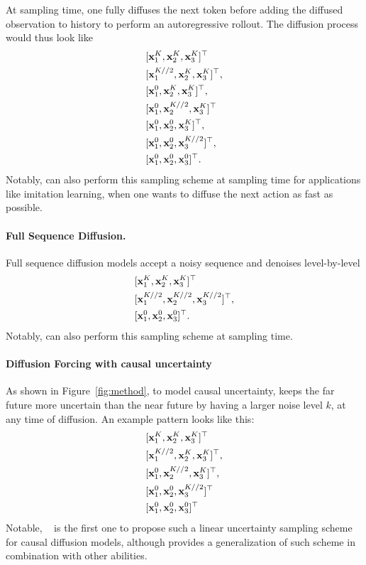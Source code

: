 At sampling time, one fully diffuses the next token before adding the diffused observation to history to perform an autoregressive rollout. The diffusion process would thus look like 
\begin{align*}
&[\mathbf{x}_1^K,\mathbf{x}_2^K,\mathbf{x}_3^K]^\top\\
&[\mathbf{x}_1^{K//2},\mathbf{x}_2^K,\mathbf{x}_3^K]^\top,\\
&[\mathbf{x}_1^{0},\mathbf{x}_2^{K},\mathbf{x}_3^{K}]^\top,\\
&[\mathbf{x}_1^{0},\mathbf{x}_2^{K//2},\mathbf{x}_3^{K}]^\top\\
&[\mathbf{x}_1^{0},\mathbf{x}_2^{0},\mathbf{x}_3^{K}]^\top,\\
&[\mathbf{x}_1^{0},\mathbf{x}_2^{0},\mathbf{x}_3^{K//2}]^\top,\\
&[\mathbf{x}_1^{0},\mathbf{x}_2^{0},\mathbf{x}_3^{0}]^\top.
\end{align*}
Notably, \algo{} can also perform this sampling scheme at sampling time for applications like imitation learning, when one wants to diffuse the next action as fast as possible.

\paragraph{Full Sequence Diffusion.}
Full sequence diffusion models accept a noisy sequence and denoises level-by-level
\begin{align*}
&[\mathbf{x}_1^K,\mathbf{x}_2^K,\mathbf{x}_3^K]^\top\\
&[\mathbf{x}_1^{K//2},\mathbf{x}_2^{K//2},\mathbf{x}_3^{K//2}]^\top,\\
&[\mathbf{x}_1^{0},\mathbf{x}_2^{0},\mathbf{x}_3^{0}]^\top.
\end{align*}
Notably, \algo{} can also perform this sampling scheme at sampling time.

\paragraph{Diffusion Forcing with causal uncertainty}
As shown in Figure~\ref{fig:method}, to model causal uncertainty, \algo{} keeps the far future more uncertain than the near future by having a larger noise level $k$, at any time of diffusion. An example pattern looks like this:
\begin{align*}
&[\mathbf{x}_1^K,\mathbf{x}_2^K,\mathbf{x}_3^K]^\top\\
&[\mathbf{x}_1^{K//2},\mathbf{x}_2^K,\mathbf{x}_3^K]^\top,\\
&[\mathbf{x}_1^{0},\mathbf{x}_2^{K//2},\mathbf{x}_3^{K}]^\top,\\
&[\mathbf{x}_1^{0},\mathbf{x}_2^{0},\mathbf{x}_3^{K//2}]^\top\\
&[\mathbf{x}_1^{0},\mathbf{x}_2^{0},\mathbf{x}_3^{0}]^\top
\end{align*}
Notable, ~\cite{wu2023ardiffusion} is the first one to propose such a linear uncertainty sampling scheme for causal diffusion models, although \algo{} provides a generalization of such scheme in combination with other abilities.

